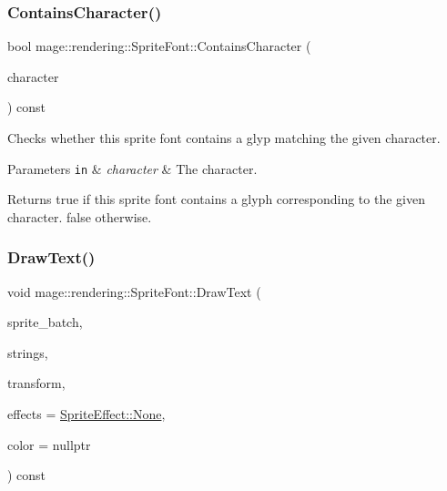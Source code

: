 \subsubsection{\texorpdfstring{Contains\+Character()}{ContainsCharacter()}}
{\footnotesize\ttfamily bool mage\+::rendering\+::\+Sprite\+Font\+::\+Contains\+Character (\begin{DoxyParamCaption}\item[{wchar\+\_\+t}]{character }\end{DoxyParamCaption}) const}

Checks whether this sprite font contains a glyp matching the given character.


\begin{DoxyParams}[1]{Parameters}
\mbox{\tt in}  & {\em character} & The character. \\
\hline
\end{DoxyParams}
\begin{DoxyReturn}{Returns}
{\ttfamily true} if this sprite font contains a glyph corresponding to the given character. {\ttfamily false} otherwise. 
\end{DoxyReturn}
\hypertarget{classmage_1_1rendering_1_1_sprite_font_a7fcea81ff14bc87c61688dda7ca56e85}{}\label{classmage_1_1rendering_1_1_sprite_font_a7fcea81ff14bc87c61688dda7ca56e85} 
\subsubsection{\texorpdfstring{Draw\+Text()}{DrawText()}}
{\footnotesize\ttfamily void mage\+::rendering\+::\+Sprite\+Font\+::\+Draw\+Text (\begin{DoxyParamCaption}\item[{\hyperlink{classmage_1_1rendering_1_1_sprite_batch}{Sprite\+Batch} \&}]{sprite\+\_\+batch,  }\item[{gsl\+::span$<$ const \hyperlink{classmage_1_1rendering_1_1_color_string}{Color\+String} $>$}]{strings,  }\item[{const \hyperlink{classmage_1_1_sprite_transform}{Sprite\+Transform} \&}]{transform,  }\item[{\hyperlink{namespacemage_1_1rendering_a4dbc3536c87b906f1d41d863ec458e78}{Sprite\+Effect}}]{effects = {\ttfamily \hyperlink{namespacemage_1_1rendering_a4dbc3536c87b906f1d41d863ec458e78a6adf97f83acf6453d4a6a4b1070f3754}{Sprite\+Effect\+::\+None}},  }\item[{const \hyperlink{structmage_1_1_s_r_g_b_a}{S\+R\+G\+BA} $\ast$}]{color = {\ttfamily nullptr} }\end{DoxyParamCaption}) const}

